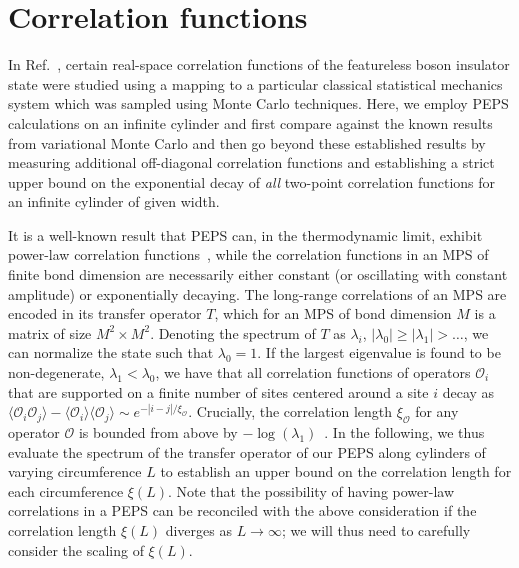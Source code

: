 
\section{Correlation functions}

In Ref.~, certain real-space correlation functions
of the featureless boson insulator state were studied using a mapping to
a particular classical statistical mechanics system which was sampled using
Monte Carlo techniques.
Here, we employ PEPS calculations on an infinite cylinder and first compare
against the known results from variational Monte Carlo and then go beyond
these established results by measuring additional off-diagonal correlation
functions and establishing a strict upper bound on the exponential decay
of \emph{all} two-point correlation functions for an infinite cylinder of
given width.

It is a well-known result that PEPS can, in the thermodynamic limit,
exhibit power-law correlation functions~\cite{?}, while the correlation
functions in an MPS of finite bond dimension are necessarily either constant
(or oscillating with constant amplitude) or exponentially decaying. The
long-range correlations of an MPS are encoded in its transfer operator $T$,
which for an MPS of bond dimension $M$ is a matrix of size $M^2 \times M^2$.
Denoting the spectrum of $T$ as $\lambda_i$, $|\lambda_0| \geq |\lambda_1| > \ldots$,
we can normalize the state such that $\lambda_0 = 1$. If the largest eigenvalue
is found to be non-degenerate, $\lambda_1 < \lambda_0$, we have that all correlation
functions of operators $\mathcal{O}_i$ that are supported on a finite number of sites centered
around a site $i$ decay as
$\langle \mathcal{O}_i \mathcal{O}_j \rangle - \langle \mathcal{O}_i \rangle \langle \mathcal{O}_j \rangle \sim e^{-|i-j|/\xi_\mathcal{O}}$.
Crucially, the correlation length $\xi_\mathcal{O}$ for any operator $\mathcal{O}$
is bounded from above by $-\log(\lambda_1)$~\cite{?}. In the following, we thus
evaluate the spectrum of the transfer operator of our PEPS along cylinders of varying
circumference $L$ to establish an upper bound on the correlation length for each
circumference $\xi(L)$.
Note that the possibility of having power-law correlations in a PEPS can
be reconciled with the above consideration if the correlation length $\xi(L)$
diverges as $L \rightarrow \infty$; we will thus need to carefully consider the scaling
of $\xi(L)$.


